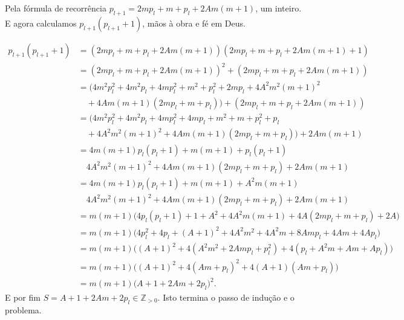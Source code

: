 \documentclass[repertorio-solutions-1.tex]{subfiles}
\begin{document}
\begin{solution}
Pela fórmula de recorrência $p_{l+1}=2mp_l+m+p_l+2Am(m+1)$, um inteiro. E agora calculamos $p_{l+1}(p_{l+1}+1)$, mãos à obra e fé em Deus.

\begin{align*}
p_{l+1}(p_{l+1}+1)
&=(2mp_l+m+p_l+2Am(m+1))(2mp_l+m+p_l+2Am(m+1)+1) \\
&=(2mp_l+m+p_l+2Am(m+1))^2+(2mp_l+m+p_l+2Am(m+1)) \\
&=(4m^2p_l^2+4m^2p_l+4mp_l^2+m^2+p_l^2+2mp_l+4A^2m^2(m+1)^2 \\
&\quad +4Am(m+1)(2mp_l+m+p_l)) + (2mp_l+m+p_l+2Am(m+1)) \\
&=(4m^2p_l^2+4m^2p_l+4mp_l^2+4mp_l+m^2+m+p_l^2+p_l \\
&\quad +4A^2m^2(m+1)^2+4Am(m+1)(2mp_l+m+p_l)) + 2Am(m+1) \\
&=4m(m+1)p_l(p_l+1)+m(m+1)+p_l(p_l+1) \\
&\quad 4A^2m^2(m+1)^2+4Am(m+1)(2mp_l+m+p_l) + 2Am(m+1) \\
&=4m(m+1)p_l(p_l+1)+m(m+1)+A^2m(m+1) \\
&\quad 4A^2m^2(m+1)^2+4Am(m+1)(2mp_l+m+p_l) + 2Am(m+1) \\
&=m(m+1)\Big(4p_l(p_l+1)+1+A^2+4A^2m(m+1)+4A(2mp_l+m+p_l)+2A\Big) \\
&=m(m+1)\Big(4p_l^2+4p_l+(A+1)^2+4A^2m^2+4A^2m+8Amp_l+4Am+4Ap_l\Big) \\
&=m(m+1)\Big((A+1)^2+4(A^2m^2+2Amp_l+p_l^2)+4(p_l+A^2m+Am+Ap_l)\Big) \\
&=m(m+1)\Big((A+1)^2+4(Am+p_l)^2+4(A+1)(Am+p_l)\Big) \\
&=m(m+1)\big(A+1+2Am+2p_l\big)^2.
\end{align*}
E por fim $S=A+1+2Am+2p_l\in\mathbb{Z}_{> 0}$.
Isto termina o passo de indução e o problema.
\end{solution}
\end{document}
